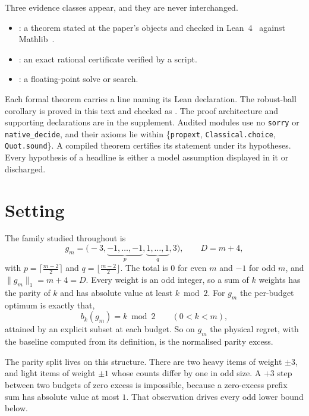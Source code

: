 Three evidence classes appear, and they are never interchanged.
\begin{itemize}
\item \PROVED: a theorem stated at the paper's objects and checked in
Lean~4~\cite{demoura2021} against Mathlib~\cite{mathlib2020}.
\item \CERT: an exact rational certificate verified by a script.
\item \NUM: a floating-point solve or search.
\end{itemize}
Each formal theorem carries a line naming its Lean declaration. The robust-ball corollary
is proved in this text and checked as . The proof architecture and supporting
declarations are in the supplement. Audited modules use no \texttt{sorry} or
\texttt{native\_decide}, and their axioms lie within \{\texttt{propext},
\texttt{Classical.choice}, \texttt{Quot.sound}\}. A compiled theorem certifies its statement
under its hypotheses. Every hypothesis of a headline is either a model assumption displayed
in it or discharged.

\section{Setting}
\label{sec:setting}

The family studied throughout is
\begin{equation}
g_{m}=\bigl(-3,\underbrace{-1,\dots,-1}_{p},\underbrace{1,\dots,1}_{q},3\bigr),
\qquad D=m+4,
\label{eq:family}
\end{equation}
with $p=\lceil\frac{m-2}{2}\rceil$ and $q=\lfloor\frac{m-2}{2}\rfloor$. The total is $0$ for
even $m$ and $-1$ for odd $m$, and $\|g_{m}\|_{1}=m+4=D$. Every weight is an odd integer, so
a sum of $k$ weights has the parity of $k$ and has absolute value at least $k\bmod2$. For
$g_{m}$ the per-budget optimum is exactly that,
\begin{equation}
b_{k}(g_{m})=k\bmod 2\qquad(0<k<m),
\label{eq:baseline}
\end{equation}
attained by an explicit subset at each budget. So on $g_{m}$ the physical regret, with the
baseline computed from its definition, is the normalised parity excess.


The parity split lives on this structure. There are two heavy items of weight $\pm3$, and
light items of weight $\pm1$ whose counts differ by one in odd size. A $+3$ step between two
budgets of zero excess is impossible, because a zero-excess prefix sum has absolute value at
most $1$. That observation drives every odd lower bound below.

